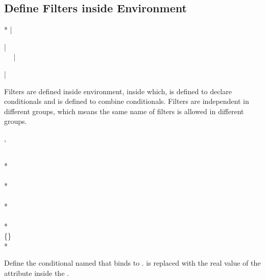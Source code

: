 \documentclass[full]{l3doc}
\begin{document}
\begin{documentation}
\subsection{Define Filters inside  Environment}

\noindent{}
\begin{Syntax}*
  |\begin{rvGroupFilters}| \\
  ~~
  |\end{rvGroupFilters}| \\
\end{Syntax}

Filters are defined inside  environment, inside which,
 is defined to declare conditionals and
 is defined to combine conditionals. Filters are
independent in different groups, which means the same name of filters is
allowed in different groups.

\begin{function}{\rvNewConditional, \rvNewConditional*}
  \begin{syntax}
                \\
    *           \\[2pt]
         \\
    *    \\
         \\
    *    \\
          \\
    *     \\
          \{\textbar{}\} \\
    *     
  \end{syntax}

  Define the conditional named  that binds to . 
  is replaced with the real value of the attribute inside the .
\end{function}


\end{documentation}
\end{document}
